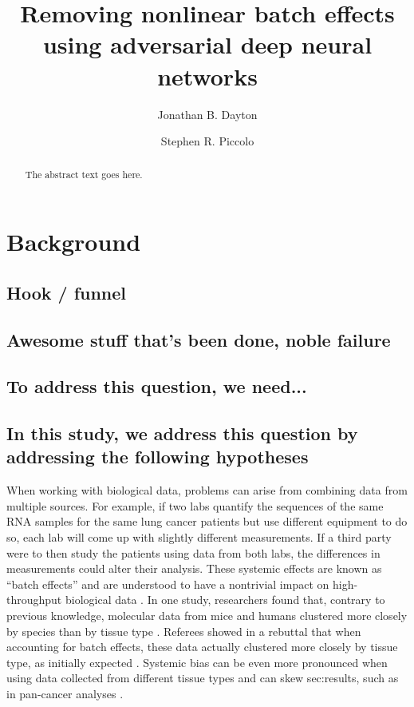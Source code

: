 \documentclass[notitlepage]{article}
\begin{document}
\title{Removing nonlinear batch effects using adversarial deep neural networks}
\author[1]{Jonathan B. Dayton}
\author[1]{Stephen R. Piccolo}
\date{}

\maketitle

\begin{abstract}
	The abstract text goes here.
\end{abstract}

\section{Background}

\subsection{Hook / funnel}

\subsection{Awesome stuff that's been done, noble failure}

\subsection{To address this question, we need...}

\subsection{In this study, we address this question by addressing the following hypotheses}

When working with biological data, problems can arise from combining data from multiple sources.
For example, if two labs quantify the sequences of the same RNA samples for the same lung cancer patients but use different equipment to do so, each lab will come up with slightly different measurements.
If a third party were to then study the patients using data from both labs, the differences in measurements could alter their analysis.
These systemic effects are known as ``batch effects'' and are understood to have a nontrivial impact on high-throughput biological data \citep{leek_tackling_2010}.
In one study, researchers found that, contrary to previous knowledge, molecular data from mice and humans clustered more closely by species than by tissue type \citep{yue_comparative_2014}.
Referees showed in a rebuttal that when accounting for batch effects, these data actually clustered more closely by tissue type, as initially expected \citep{gilad_reanalysis_2015}.
Systemic bias can be even more pronounced when using data collected from different tissue types and can skew sec:results, such as in pan-cancer analyses \citep{dayton_classifying_2017-1}.
\end{document}
